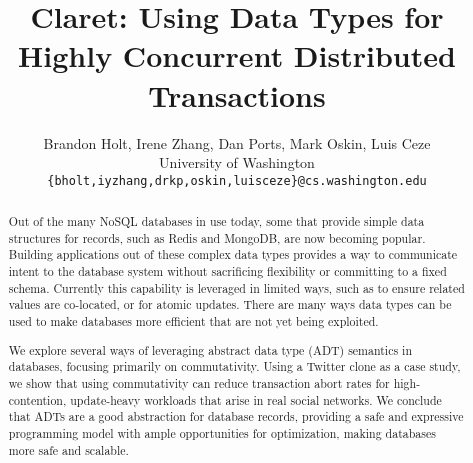 \documentclass[10pt]{article}
\begin{document}
  
  \title{Claret: Using Data Types for Highly Concurrent Distributed Transactions}
  \author{
    Brandon Holt, Irene Zhang, Dan Ports, Mark Oskin, Luis Ceze \\
    University of Washington \\
    {\tt \{bholt,iyzhang,drkp,oskin,luisceze\}@cs.washington.edu}
  }
  
  \maketitle
  
  \begin{abstract}
    Out of the many NoSQL databases in use today, some that provide simple data structures for records, such as Redis and MongoDB, are now becoming popular. Building applications out of these complex data types provides a way to communicate intent to the database system without sacrificing flexibility or committing to a fixed schema. Currently this capability is leveraged in limited ways, such as to ensure related values are co-located, or for atomic updates. There are many ways data types can be used to make databases more efficient that are not yet being exploited.

    We explore several ways of leveraging abstract data type (ADT) semantics in databases, focusing primarily on commutativity. Using a Twitter clone as a case study, we show that using commutativity can reduce transaction abort rates for high-contention, update-heavy workloads that arise in real social networks. We conclude that ADTs are a good abstraction for database records, providing a safe and expressive programming model with ample opportunities for optimization, making databases more safe and scalable.
  \end{abstract}
  
\end{document}
